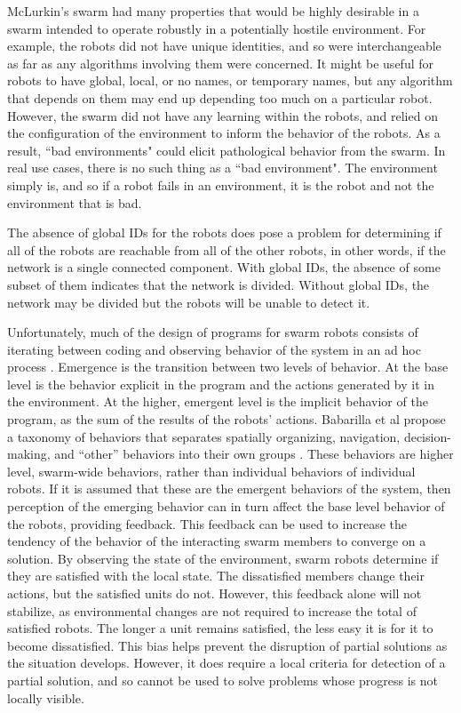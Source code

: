 \documentclass[]{article}
\begin{document}
McLurkin's swarm had many properties that would be highly desirable in a swarm intended to operate robustly in a potentially hostile environment. 
For example, the robots did not have unique identities, and so were interchangeable as far as any algorithms involving them were concerned. 
It might be useful for robots to have global, local, or no names, or temporary names, but any algorithm that depends on them may end up depending too much on a particular robot. 
However, the swarm did not have any learning within the robots, and relied on the configuration of the environment to inform the behavior of the robots. 
As a result, ``bad environments" could elicit pathological behavior from the swarm. 
In real use cases, there is no such thing as a ``bad environment". 
The environment simply is, and so if a robot fails in an environment, it is the robot and not the environment that is bad. 

The absence of global IDs for the robots does pose a problem for determining if all of the robots are reachable from all of the other robots, in other words, if the network is a single connected component. 
With global IDs, the absence of some subset of them indicates that the network is divided. 
Without global IDs, the network may be divided but the robots will be unable to detect it. 

Unfortunately, much of the design of programs for swarm robots consists of iterating between coding and observing behavior of the system in an ad hoc process \cite{palmer2005behavioral}. 
Emergence is the transition between two levels of behavior. 
At the base level is the behavior explicit in the program and the actions generated by it in the environment. 
At the higher, emergent level is the implicit behavior of the program, as the sum of the results of the robots' actions. 
Babarilla et al propose a taxonomy of behaviors that separates spatially organizing, navigation, decision-making, and ``other'' behaviors into their own groups \cite{brambilla2013swarm}. 
These behaviors are higher level, swarm-wide behaviors, rather than individual behaviors of individual robots. 
If it is assumed that these are the emergent behaviors of the system, then perception of the emerging behavior can in turn affect the base level behavior of the robots, providing feedback. 
This feedback can be used to increase the tendency of the behavior of the interacting swarm members to converge on a solution. 
By observing the state of the environment, swarm robots determine if they are satisfied with the local state. 
The dissatisfied members change their actions, but the satisfied units do not. 
However, this feedback alone will not stabilize, as environmental changes are not required to increase the total of satisfied robots. 
The longer a unit remains satisfied, the less easy it is for it to become dissatisfied. 
This bias helps prevent the disruption of partial solutions as the situation develops. 
However, it does require a local criteria for detection of a partial solution, and so cannot be used to solve problems whose progress is not locally visible. 
\end{document}
